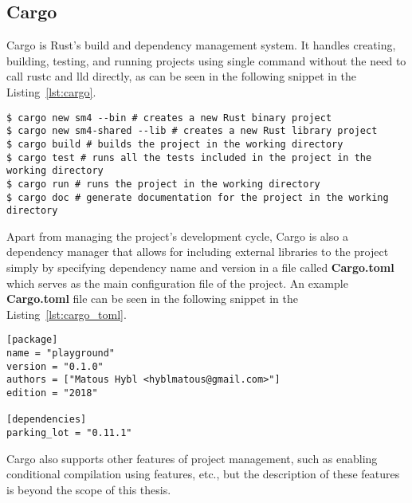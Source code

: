 \newpage
\subsection{Cargo}
\label{subsec:cargo}
Cargo is Rust's build and dependency management system.
It handles creating, building, testing, and running projects using single command without the need to call rustc and lld directly, as can be seen in the following snippet in the Listing~\ref{lst:cargo}.

\begin{lstlisting}[caption={Using cargo for project development cycle.},label=lst:cargo]
$ cargo new sm4 --bin # creates a new Rust binary project
$ cargo new sm4-shared --lib # creates a new Rust library project
$ cargo build # builds the project in the working directory
$ cargo test # runs all the tests included in the project in the working directory
$ cargo run # runs the project in the working directory
$ cargo doc # generate documentation for the project in the working directory
\end{lstlisting}

Apart from managing the project's development cycle, Cargo is also a dependency manager that allows for including external libraries to the project simply by specifying dependency name and version in a file called \textbf{Cargo.toml} which serves as the main configuration file of the project.
An example \textbf{Cargo.toml} file can be seen in the following snippet in the Listing~\ref{lst:cargo_toml}.

\begin{lstlisting}[caption={An example Cargo.toml file containing project definition.},label=lst:cargo_toml]
[package]
name = "playground"
version = "0.1.0"
authors = ["Matous Hybl <hyblmatous@gmail.com>"]
edition = "2018"

[dependencies]
parking_lot = "0.11.1"
\end{lstlisting}

Cargo also supports other features of project management, such as enabling conditional compilation using features, etc., but the description of these features is beyond the scope of this thesis.
